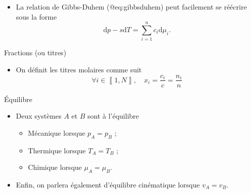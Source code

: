 \documentclass[
  ignorenonframetext,
]{beamer}
\providecommand{\tightlist}{%
  \setlength{\itemsep}{0pt}\setlength{\parskip}{0pt}}
\begin{document}
\begin{frame}
\begin{itemize}
\tightlist
\item
  La relation de Gibbs-Duhem (@eq:gibbsduhem) peut facilement se
  réécrire sous la forme \[
  \mathrm{d} p - s \mathrm{d} T = \sum _ {i = 1} ^ n c _ i \mathrm{d} \mu _ i.
  \]
\end{itemize}
\end{frame}

\begin{frame}{Fractions (ou titres)}
\protect\hypertarget{fractions-ou-titres}{}
\begin{itemize}
\tightlist
\item
  On définit les titres molaires comme suit \[
  \forall i \in \left \llbracket 1, N \right \rrbracket, \quad x _ i = \frac{c _ i}{c} = \frac{n _ i}{n}
  \]
\end{itemize}
\end{frame}

\begin{frame}{Équilibre}
\protect\hypertarget{uxe9quilibre}{}
\begin{itemize}
\item
  Deux systèmes \(A\) et \(B\) sont à l'équilibre

  \begin{itemize}
  \tightlist
  \item
    Mécanique lorsque \(p _ A = p _ B\) ;
  \item
    Thermique lorsque \(T _ A = T _ B\) ;
  \item
    Chimique lorsque \(\mu _ A = \mu _ B\).
  \end{itemize}
\item
  Enfin, on parlera également d'équilibre cinématique lorsque
  \(v _ A = v _ B\).
\end{itemize}
\end{frame}
\end{document}
